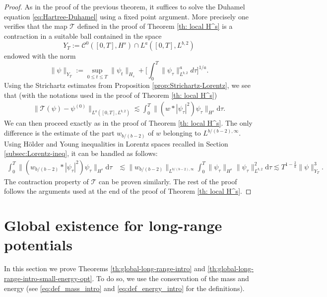 \documentclass[12pt]{article}
\theoremstyle{plain}
\begin{document}
	\begin{proof}
	As in the proof of the previous theorem, it suffices to solve the Duhamel equation \eqref{eq:Hartree-Duhamel} using a fixed point argument. More precisely one verifies that the map $\mathcal{T}$ defined in the proof of Theorem \ref{th: local H^s} is a contraction in a suitable ball contained in the space
	\begin{equation*}
	    Y_T:=\mathcal{C}^{0}([0,T],H^{s})\cap L^a([0,T],L^{b,2})
	\end{equation*}
	endowed with the norm
	\begin{equation*}
	    \|\psi\|_{Y_T}:=\sup_{0\le t\le T}\|\psi_t\|_{H_s}+\Big[\int_0^T\|\psi_\tau\|^a_{L^{b,2}}d\tau\Big]^{1/a}.
	\end{equation*}
	Using the Strichartz estimates from Proposition \ref{prop:Strichartz-Lorentz}, we see that (with the notations used in the proof of Theorem \ref{th: local H^s})
	\begin{align*}
\|\mathcal{T}(\psi)-\psi^{(0)}\|_{L^a([0,T],L^{b,2})} \lesssim\int_{0}^{T}\|(w*|\psi_{\tau}|^{2})\psi_{\tau}\|_{H^{s}}\mathrm{d}\tau.
 \end{align*}
  We can then proceed exactly as in the proof of Theorem \ref{th: local H^s}. The only difference is the estimate of the part $w_{b/(b-2)}$ of $w$ belonging to $L^{b/(b-2),\infty}$. Using Hölder and Young inequalities in Lorentz spaces recalled in Section \ref{subsec:Lorentz-ineq}, it can be handled as follows:
	   \begin{align}\label{eq:w_ad/4}
	   \int_{0}^{T}\|(w_{b/(b-2)}*|\psi_{\tau}|^{2})\psi_{\tau}\|_{H^{s}}\mathrm{d}\tau&\lesssim\|w_{b/(b-2)}\|_{L^{b/(b-2),\infty}}\int_{0}^{T}\|\psi_\tau\|_{H^s}\|\psi_\tau\|^2_{L^{b,2}}\mathrm{d}\tau\lesssim T^{1-\frac2a}\|\psi\|_{Y_T}^3.
	   \end{align}
The contraction property of $\mathcal{T}$ can be proven similarly. The rest of the proof follows the arguments used at the end of the proof of Theorem \ref{th: local H^s}.   
	\end{proof}
	
	
	
	
	\section{Global existence for long-range potentials}\label{sec:global-long}
	


In this section we prove Theorems \ref{th:global-long-range-intro} and \ref{th:global-long-range-intro-small-energy-opt}. To do so, we use the conservation of the mass and energy (see \eqref{eq:def_mass_intro} and \eqref{eq:def_energy_intro} for the definitions).
\end{document}
